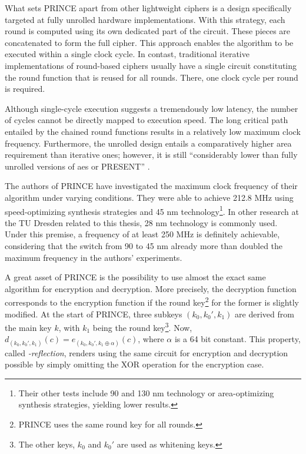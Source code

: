 What sets PRINCE apart from other lightweight ciphers is a design specifically targeted at fully unrolled hardware implementations. With this
strategy, each round is computed using its own dedicated part of the circuit. These pieces are concatenated to form the full cipher. This approach
enables the algorithm to be executed within a single clock cycle. In contast, traditional iterative implementations of round-based ciphers usually
have a single circuit constituting the round function that is reused for all rounds. There, one clock cycle per round is required.

Although single-cycle execution suggests a tremendously low latency, the number of cycles cannot be directly mapped to execution speed. The long critical path
entailed by the chained round functions results in a relatively low maximum clock frequency. Furthermore, the unrolled design entails a comparatively
higher area requirement than iterative ones; however, it is still \enquote{considerably lower than fully unrolled versions of \gls{aes} or PRESENT}
\cite[3]{borghoff12prince}.

The authors of PRINCE have investigated the maximum clock frequency of their algorithm under varying conditions. They were able to achieve 212.8 MHz
using speed-optimizing synthesis strategies and 45 nm technology\footnote{Their other tests include 90 and 130 nm technology or area-optimizing
synthesis strategies, yielding lower results.}. In other research at the TU Dresden related to this thesis, 28 nm technology is commonly used. Under
this premise, a frequency of at least 250 MHz is definitely achievable, considering that the switch from 90 to 45 nm already more than doubled
the maximum frequency in the authors' experiments.

A great asset of PRINCE is the possibility to use almost the exact same algorithm for encryption and decryption. More precisely, the decryption
function corresponds to the encryption function if the round key\footnote{PRINCE uses the same round key for all rounds.} for the former is slightly
modified. At the start of PRINCE, three subkeys $(k_0, k_0', k_1)$ are derived from the main key $k$, with $k_1$ being the round key\footnote{The
other keys, $k_0$ and $k_0'$ are used as whitening keys.}. Now, $d_{(k_0, k_0', k_1)}(c) = e_{(k_0, k_0', k_1 \oplus \alpha)}(c)$, where $\alpha$ is a
64 bit constant. This property, called \textit{\alpha-reflection}, renders using the same circuit for encryption and decryption possible by simply
omitting the XOR operation for the encryption case.


